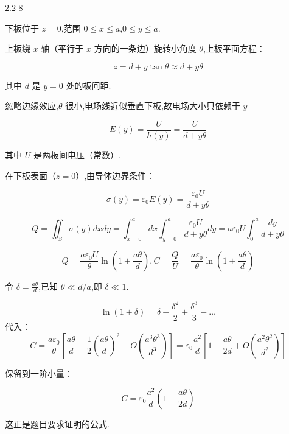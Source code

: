 \documentclass{article}
\begin{document}
2.2-8 %




下板位于 $ z = 0 $,范围 $ 0 \le x \le a $,$ 0 \le y \le a $.

上板绕 $ x $ 轴（平行于 $ x $ 方向的一条边）旋转小角度 $ \theta $,上板平面方程：

$$z = d + y \tan\theta \approx d + y\theta$$

其中 $ d $ 是 $ y=0 $ 处的板间距.



忽略边缘效应,$ \theta $ 很小,电场线近似垂直下板,故电场大小只依赖于 $ y $

$$E(y) = \frac{U}{h(y)} = \frac{U}{d + y\theta}$$

其中 $ U $ 是两板间电压（常数）.



在下板表面（$ z=0 $）,由导体边界条件：

$$\sigma(y) = \varepsilon_0 E(y) = \frac{\varepsilon_0 U}{d + y\theta}$$



$$Q = \iint_S \sigma(y)dxdy= \int_{x=0}^{a} dx \int_{y=0}^{a} \frac{\varepsilon_0 U}{d + y\theta} dy= a \varepsilon_0 U \int_{0}^{a} \frac{dy}{d + y\theta}$$


$$Q = \frac{a \varepsilon_0 U}{\theta} \ln\left( 1 + \frac{a\theta}{d} \right),C = \frac{Q}{U} = \frac{a \varepsilon_0}{\theta} \ln\left( 1 + \frac{a\theta}{d} \right)$$


令 $ \delta = \frac{a\theta}{d} $,已知 $ \theta \ll d/a $,即 $ \delta \ll 1 $.

$$\ln(1+\delta) = \delta - \frac{\delta^2}{2} + \frac{\delta^3}{3} - \dots$$
代入：
$$C = \frac{a \varepsilon_0}{\theta} \left[ \frac{a\theta}{d} - \frac{1}{2} \left( \frac{a\theta}{d} \right)^2 + O\left( \frac{a^3\theta^3}{d^3} \right) \right]= \varepsilon_0 \frac{a^2}{d} \left[ 1 - \frac{a\theta}{2d} + O\left( \frac{a^2\theta^2}{d^2} \right) \right]$$




保留到一阶小量：

$$\boxed{C = \varepsilon_0 \frac{a^2}{d} \left( 1 - \frac{a\theta}{2d} \right)}$$

这正是题目要求证明的公式.




\newpage
\end{document}
